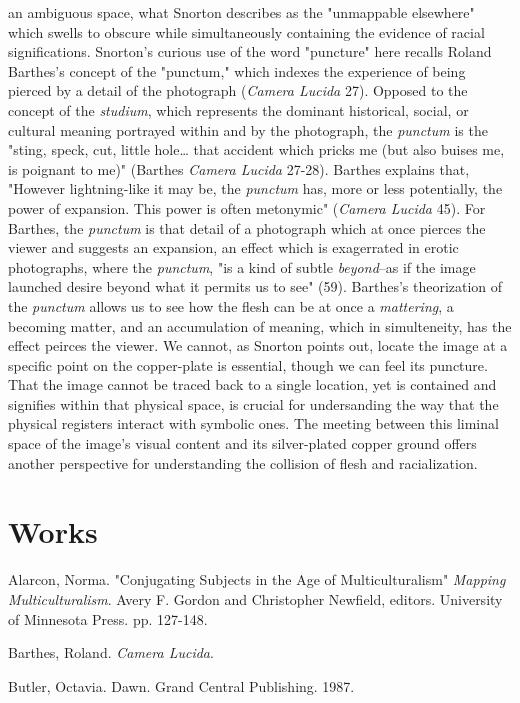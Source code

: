 \documentclass[11pt]{article}
\begin{document}
an ambiguous space, what Snorton describes as the "unmappable
elsewhere" which swells to obscure while simultaneously containing the
evidence of racial significations. Snorton's curious use of the word
"puncture" here recalls Roland Barthes's concept of the "punctum,"
which indexes the experience of being pierced by a detail of the
photograph (\emph{Camera Lucida} 27). Opposed to the concept of the
\emph{studium}, which represents the dominant historical, social, or
cultural meaning portrayed within and by the photograph, the \emph{punctum}
is the "sting, speck, cut, little hole\ldots{} that accident which pricks
me (but also buises me, is poignant to me)" (Barthes \emph{Camera Lucida}
27-28). Barthes explains that, "However lightning-like it may be, the
\emph{punctum} has, more or less potentially, the power of expansion. This
power is often metonymic" (\emph{Camera Lucida} 45). For Barthes, the
\emph{punctum} is that detail of a photograph which at once pierces the
viewer and suggests an expansion, an effect which is exagerrated in
erotic photographs, where the \emph{punctum}, "is a kind of subtle
\emph{beyond}--as if the image launched desire beyond what it permits us to
see" (59). Barthes's theorization of the \emph{punctum} allows us to see
how the flesh can be at once a \emph{mattering}, a becoming matter, and an
accumulation of meaning, which in simulteneity, has the effect peirces
the viewer. We cannot, as Snorton points out, locate the image at a
specific point on the copper-plate is essential, though we can feel
its puncture. That the image cannot be traced back to a single
location, yet is contained and signifies within that physical space,
is crucial for undersanding the way that the physical registers
interact with symbolic ones. The meeting between this liminal space of
the image's visual content and its silver-plated copper ground offers
another perspective for understanding the collision of flesh and
racialization.


\section{Works}
\label{sec:orgeca1451}
Alarcon, Norma. "Conjugating Subjects in the Age of Multiculturalism"
\emph{Mapping Multiculturalism}. Avery F. Gordon and Christopher Newfield,
editors. University of Minnesota Press. pp. 127-148.

Barthes, Roland. \emph{Camera Lucida}.

Butler, Octavia. Dawn. Grand Central Publishing. 1987.
\end{document}
